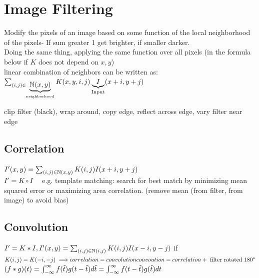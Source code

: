 \section{Image Filtering}
Modify the pixels of an image based on some function of the local neighborhood of the pixels- If sum greater 1 get brighter, if smaller darker.\\
 Doing the same thing, applying the same function over all pixels (in the formula below if $K$ does not depend on $x, y$)\\
 linear combination of neighbors can be written as: \\
$\sum_{\begin{subarray}{c}
    (i, j) \in \underbrace{\mathbb{N}(x, y)}_{\text{neighborhood}}
\end{subarray}}
K(x, y, i, j) \underbrace{I}_{\text{Input}} (x + i, y + j)$

 clip filter (black), wrap around, copy edge, reflect across edge, vary filter near edge
\subsection*{Correlation}
$I'(x, y) = \sum_{(i, j) \in \mathbb{N}(x, y)} K(i, j) I (x + i, y + j)$ \\
$I' = K \circ I \quad$ e.g. template matching: search for best match by minimizing mean squared error or maximizing area correlation. (remove mean (from filter, from image) to avoid bias)
\subsection*{Convolution}
$I' = K * I, I'(x, y) = \sum_{(i, j) \in \mathbb{N}(i, j)} K(i, j) I (x - i, y - j)$ if $K(i, j) = K (-i, -j) \implies \\
correlation = convolution \quad\\
convoution = correlation + \text{ filter rotated 180°}$\\
 $(f * g)(t) \\
= \int_{-\infty}^{\infty} f(\tilde{t}) g(t - \tilde{t}) d\tilde{t}\\
= \int_{-\infty}^{\infty} f(t - \tilde{t}) g(\tilde{t}) dt$
